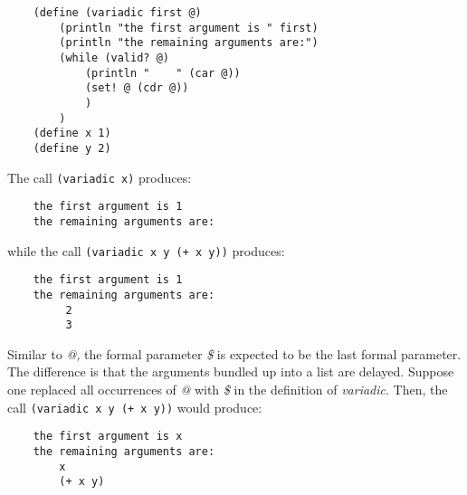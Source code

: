 \begin{verbatim}
    (define (variadic first @)
        (println "the first argument is " first)
        (println "the remaining arguments are:")
        (while (valid? @)
            (println "    " (car @))
            (set! @ (cdr @))
            )
        )
    (define x 1)
    (define y 2)
\end{verbatim}

The call \verb!(variadic x)! produces:

\begin{verbatim}
    the first argument is 1
    the remaining arguments are:
\end{verbatim}

while the call \verb!(variadic x y (+ x y))! produces:

\begin{verbatim}
    the first argument is 1
    the remaining arguments are:
         2
         3
\end{verbatim}

Similar to {\it @,} the formal parameter {\it \$} is expected to be the
last formal parameter. The difference is that the arguments
bundled up into a list
are delayed. Suppose one replaced all occurrences of {\it @} with
{\it \$} in the definition of {\it variadic}.
Then, the call \verb!(variadic x y (+ x y))! would produce:

\begin{verbatim}
    the first argument is x
    the remaining arguments are:
        x
        (+ x y)
\end{verbatim}
